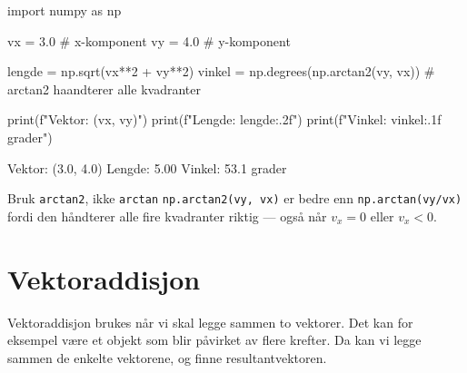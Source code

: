 \begin{pythonkode}
import numpy as np

vx = 3.0    # x-komponent
vy = 4.0    # y-komponent

lengde = np.sqrt(vx**2 + vy**2)
vinkel = np.degrees(np.arctan2(vy, vx))  # arctan2 haandterer alle kvadranter

print(f"Vektor:  ({vx}, {vy})")
print(f"Lengde:  {lengde:.2f}")
print(f"Vinkel:  {vinkel:.1f} grader")
\end{pythonkode}
\begin{pythonoutput}
Vektor:  (3.0, 4.0)
Lengde:  5.00
Vinkel:  53.1 grader
\end{pythonoutput}

\begin{mymerk*}{Bruk \texttt{arctan2}, ikke \texttt{arctan}}
\texttt{np.arctan2(vy, vx)} er bedre enn \texttt{np.arctan(vy/vx)} fordi den håndterer alle fire kvadranter riktig — også når $v_x = 0$ eller $v_x < 0$.
\end{mymerk*}


\section{Vektoraddisjon}
Vektoraddisjon brukes når vi skal legge sammen to vektorer. Det kan for eksempel være et objekt som blir påvirket av flere krefter. Da kan vi legge sammen de enkelte vektorene, og finne resultantvektoren.


